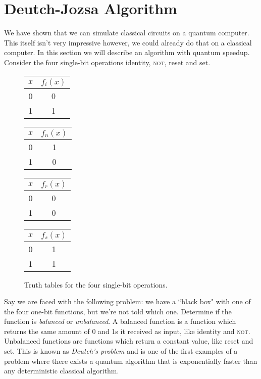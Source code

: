 \section{Deutch-Jozsa Algorithm}
We have shown that we can simulate classical circuits on a quantum computer. This itself isn't very impressive however, we could already do that on a classical computer. In this section we will describe an algorithm with quantum speedup. Consider the four single-bit operations identity, \textsc{not}, reset and set.

\begin{figure}[ht]
  \centering
  \begin{multicols}{4}
    \begin{tabular}{c|c}
      $x$ & $f_i(x)$ \\ \hline
      0 & 0 \\
      1 & 1 \\
    \end{tabular}

    \begin{tabular}{c|c}
      $x$ & $f_n(x)$ \\ \hline
      0 & 1 \\
      1 & 0 \\
    \end{tabular}

    \begin{tabular}{c|c}
      $x$ & $f_r(x)$ \\ \hline
      0 & 0 \\
      1 & 0 \\
    \end{tabular}

    \begin{tabular}{c|c}
      $x$ & $f_s(x)$ \\ \hline
      0 & 1 \\
      1 & 1 \\
    \end{tabular}
  \end{multicols}

  \vspace{4mm}
  \caption{Truth tables for the four single-bit operations.}
  \label{fig:single_bit_operations}
\end{figure}
\noindent
Say we are faced with the following problem: we have a ``black box" with one of the four one-bit functions, but we're not told which one. Determine if the function is \emph{balanced} or \emph{unbalanced}. A balanced function is a function which returns the same amount of 0 and 1s it received as input, like identity and \textsc{not}. Unbalanced functions are functions which return a constant value, like reset and set. This is known as \emph{Deutch's problem} and is one of the first examples of a problem where there exists a quantum algorithm that is exponentially faster than any deterministic classical algorithm.

